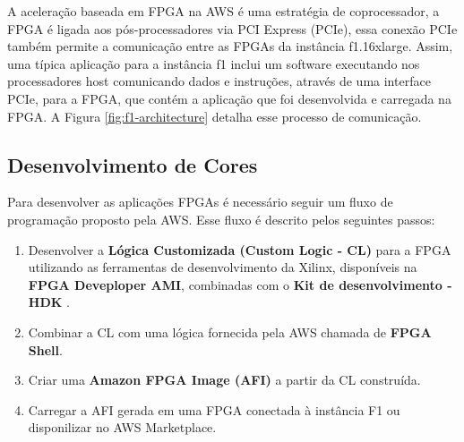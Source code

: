 A aceleração baseada em FPGA na AWS é uma estratégia de coprocessador, a FPGA é ligada aos pós-processadores via PCI Express (PCIe), essa conexão PCIe também permite a comunicação entre as FPGAs da instância f1.16xlarge. Assim, uma típica aplicação para a instância f1 inclui um software executando nos processadores host comunicando dados e instruções, através de uma interface PCIe, para a FPGA, que contém a aplicação que foi desenvolvida e carregada na FPGA. A Figura \ref{fig:f1-architecture} detalha esse processo de comunicação.

\begin{figure}[h!] 
   	    \captionsetup{width=16cm}%
	\end{figure}
    

\subsection{Desenvolvimento de Cores} \label{sec:dev}

Para desenvolver as aplicações FPGAs é necessário seguir um fluxo de programação proposto pela AWS. Esse fluxo é descrito pelos seguintes passos:

\begin{enumerate}
    \item Desenvolver a \textbf{Lógica Customizada (Custom Logic - CL)} para a FPGA utilizando as ferramentas de desenvolvimento da Xilinx, disponíveis na \textbf{FPGA Deveploper AMI}, combinadas com o \textbf{Kit de desenvolvimento - HDK }.
    
    \item Combinar a CL com uma lógica fornecida pela AWS chamada de \textbf{FPGA Shell}.
    
    \item Criar uma \textbf{Amazon FPGA Image (AFI)} a partir da CL construída.
    
    \item Carregar a AFI gerada em uma FPGA conectada à instância F1 ou disponilizar no AWS Marketplace.
\end{enumerate}

